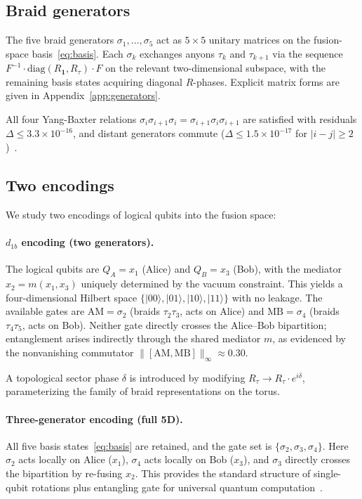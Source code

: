 \documentclass[aps,pra,twocolumn,superscriptaddress,longbibliography,floatfix,nofootinbib]{revtex4-2}
\begin{document}
\subsection{Braid generators}

The five braid generators $\sigma_1,\ldots,\sigma_5$ act as $5\times 5$
unitary matrices on the fusion-space basis~\eqref{eq:basis}.
Each $\sigma_k$ exchanges anyons $\tau_k$ and $\tau_{k+1}$ via the
sequence $F^{-1}\cdot\text{diag}(R_{\mathbf{1}},R_\tau)\cdot F$ on the
relevant two-dimensional subspace, with the remaining basis states
acquiring diagonal $R$-phases.
Explicit matrix forms are given in Appendix~\ref{app:generators}.

All four Yang-Baxter relations
$\sigma_i\sigma_{i+1}\sigma_i = \sigma_{i+1}\sigma_i\sigma_{i+1}$
are satisfied with residuals $\Delta \leq 3.3\times 10^{-16}$, and
distant generators commute ($\Delta \leq 1.5\times 10^{-17}$ for
$|i-j|\geq 2$)~\cite{Sayim2026topological}.

\subsection{Two encodings}
\label{sec:encodings}

We study two encodings of logical qubits into the fusion space:

\paragraph{$d_{1b}$ encoding (two generators).}
The logical qubits are $Q_A = x_1$ (Alice) and $Q_B = x_3$ (Bob),
with the mediator $x_2 = m(x_1,x_3)$ uniquely determined by the
vacuum constraint.
This yields a four-dimensional Hilbert space $\{|00\rangle,
|01\rangle, |10\rangle, |11\rangle\}$ with no leakage.
The available gates are $\text{AM}=\sigma_2$ (braids $\tau_2\tau_3$,
acts on Alice) and $\text{MB}=\sigma_4$ (braids $\tau_4\tau_5$,
acts on Bob).
Neither gate directly crosses the Alice--Bob bipartition;
entanglement arises indirectly through the shared mediator $m$,
as evidenced by the nonvanishing commutator
$\|[\text{AM},\text{MB}]\|_\infty \approx 0.30$.

A topological sector phase $\delta$ is introduced by modifying
$R_\tau \to R_\tau \cdot e^{i\delta}$, parameterizing the
family of braid representations on the torus.

\paragraph{Three-generator encoding (full 5D).}
All five basis states~\eqref{eq:basis} are retained, and the gate
set is $\{\sigma_2,\sigma_3,\sigma_4\}$.
Here $\sigma_2$ acts locally on Alice ($x_1$), $\sigma_4$ acts
locally on Bob ($x_3$), and $\sigma_3$ directly crosses the
bipartition by re-fusing $x_2$.
This provides the standard structure of
single-qubit rotations plus entangling gate for universal
quantum computation~\cite{Bonesteel2005}.
\end{document}
